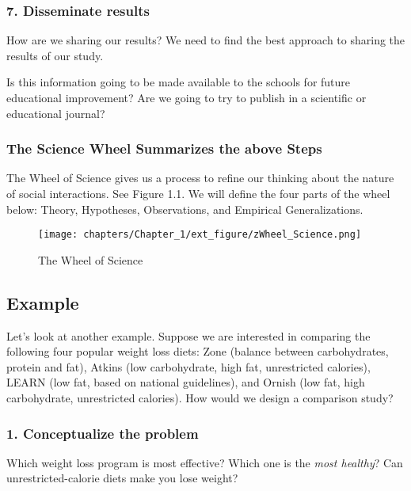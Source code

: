 \documentclass[11pt]{book}\usepackage[]{graphicx}\usepackage[]{color}
\begin{document}
\subsubsection{7. Disseminate results}

How are we sharing our results?  We need to find the best approach to sharing the results of our study.

Is this information going to be made available to the schools for future educational improvement?  Are we going to try to publish in a scientific or educational journal?


\subsubsection{The Science Wheel Summarizes the above Steps}

The Wheel of Science  \citep{Wallace1971}
gives us a process to refine our thinking about the nature of social interactions.  See Figure 1.1.  We will define the four parts of the wheel below:  Theory, Hypotheses, Observations, and Empirical Generalizations.

\begin{figure}[htbp]
   \centering

\texttt{[image: chapters/Chapter\_1/ext\_figure/zWheel\_Science.png]} %

   \caption{The Wheel of Science}
   \label{fig:WS}
\end{figure}

\subsection{Example}

Let's look at another example.  Suppose we are interested in comparing the following four popular weight loss diets: Zone (balance between carbohydrates, protein and fat), Atkins (low carbohydrate, high fat, unrestricted calories), LEARN (low fat, based on national guidelines), and Ornish (low fat, high carbohydrate, unrestricted calories).   How would we design a comparison study?

\subsubsection{1.	Conceptualize the problem}

Which weight loss program is most effective?   Which one is the \textit{most healthy}?   Can \\ unrestricted-calorie diets make you lose weight?
\end{document}
